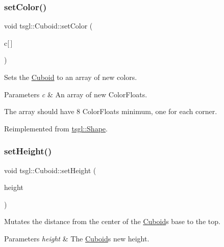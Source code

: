 \subsubsection{\texorpdfstring{set\+Color()}{setColor()}\hspace{0.1cm}{\footnotesize\ttfamily [2/2]}}
{\footnotesize\ttfamily void tsgl\+::\+Cuboid\+::set\+Color (\begin{DoxyParamCaption}\item[{\hyperlink{structtsgl_1_1_color_float}{Color\+Float}}]{c\mbox{[}$\,$\mbox{]} }\end{DoxyParamCaption})\hspace{0.3cm}{\ttfamily [virtual]}}



Sets the \hyperlink{classtsgl_1_1_cuboid}{Cuboid} to an array of new colors. 


\begin{DoxyParams}{Parameters}
{\em c} & An array of new Color\+Floats.\\
\hline
\end{DoxyParams}
The array should have 8 Color\+Floats minimum, one for each corner. 

Reimplemented from \hyperlink{classtsgl_1_1_shape_ad7e554b5d4cea111ec518548b9f21388}{tsgl\+::\+Shape}.

\mbox{\label{classtsgl_1_1_cuboid_a662cfb3fdb5afb9dff0b7efe517c8641}} 
\subsubsection{\texorpdfstring{set\+Height()}{setHeight()}}
{\footnotesize\ttfamily void tsgl\+::\+Cuboid\+::set\+Height (\begin{DoxyParamCaption}\item[{G\+Lfloat}]{height }\end{DoxyParamCaption})\hspace{0.3cm}{\ttfamily [virtual]}}



Mutates the distance from the center of the \hyperlink{classtsgl_1_1_cuboid}{Cuboid}\textquotesingle{}s base to the top. 


\begin{DoxyParams}{Parameters}
{\em height} & The \hyperlink{classtsgl_1_1_cuboid}{Cuboid}\textquotesingle{}s new height. \\
\hline
\end{DoxyParams}
\mbox{\label{classtsgl_1_1_cuboid_a877809edb072286dd3157714fc2e405d}} 
